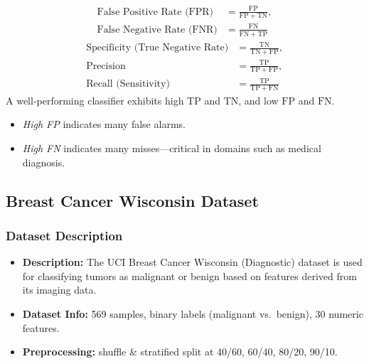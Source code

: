 \begin{flushleft}
\begin{itemize}
\begin{flushleft}
\begin{align*}
				      \text{False Positive Rate (FPR)} & = \frac{\mathrm{FP}}{\mathrm{FP} + \mathrm{TN}},                                           \\
				      \text{False Negative Rate (FNR)} & = \frac{\mathrm{FN}}{\mathrm{FN} + \mathrm{TP}}
			      \end{align*}
			      \begin{align*}
				      \text{Specificity (True Negative Rate)} & = \frac{\mathrm{TN}}{\mathrm{TN} + \mathrm{FP}}, \\
				      \text{Precision}                        & = \frac{\mathrm{TP}}{\mathrm{TP} + \mathrm{FP}}, \\
				      \text{Recall (Sensitivity)}             & = \frac{\mathrm{TP}}{\mathrm{TP} + \mathrm{FN}}
			      \end{align*}
			      \noindent A well‐performing classifier exhibits high \(\mathrm{TP}\) and \(\mathrm{TN}\), and low \(\mathrm{FP}\) and \(\mathrm{FN}\).
			      \begin{itemize}
				      \item \emph{High FP} indicates many false alarms.
				      \item \emph{High FN} indicates many misses—critical in domains such as medical diagnosis.
			      \end{itemize}
		      \end{flushleft}
	\end{itemize}
\end{flushleft}

\clearpage
\subsection{Breast Cancer Wisconsin Dataset}
\subsubsection*{Dataset Description}
\begin{itemize}
	\item \textbf{Description:} The UCI Breast Cancer Wisconsin (Diagnostic) dataset is used for classifying tumors as malignant or benign based on features derived from its imaging data.
	\item \textbf{Dataset Info:} 569 samples, binary labels (malignant vs.\ benign), 30 numeric features.
	\item \textbf{Preprocessing:} shuffle \& stratified split at 40/60, 60/40, 80/20, 90/10.
\end{itemize}

